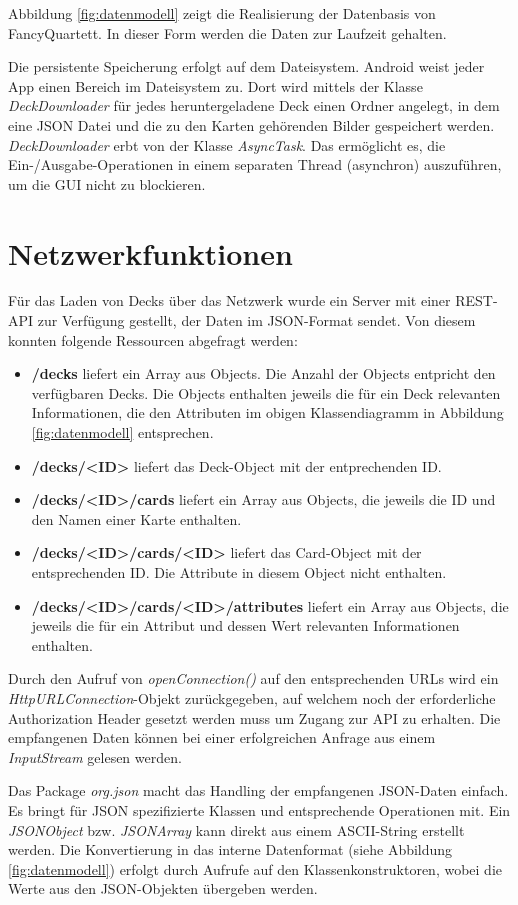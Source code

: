 Abbildung \ref{fig:datenmodell} zeigt die Realisierung der Datenbasis von FancyQuartett. In dieser Form werden die Daten zur Laufzeit gehalten.

Die persistente Speicherung erfolgt auf dem Dateisystem. Android weist jeder App einen Bereich im Dateisystem zu. Dort wird mittels der Klasse \emph{DeckDownloader} für jedes heruntergeladene Deck einen Ordner angelegt, in dem eine JSON Datei und die zu den Karten gehörenden Bilder gespeichert werden. \emph{DeckDownloader} erbt von der Klasse \emph{AsyncTask}. Das ermöglicht es, die Ein-/Ausgabe-Operationen in einem separaten Thread (asynchron) auszuführen, um die GUI nicht zu blockieren.

\section{Netzwerkfunktionen}
\label{sec:netzwerkfunktionen}

Für das Laden von Decks über das Netzwerk wurde ein Server mit einer REST-API zur Verfügung gestellt, der Daten im JSON-Format sendet. Von diesem konnten folgende Ressourcen abgefragt werden:
\begin{itemize}
    \item \textbf{/decks} liefert ein Array aus Objects. Die Anzahl der Objects entpricht den verfügbaren Decks. Die Objects enthalten jeweils die für ein Deck relevanten Informationen, die den Attributen im obigen Klassendiagramm in Abbildung \ref{fig:datenmodell} entsprechen.
    \item \textbf{/decks/<ID>} liefert das Deck-Object mit der entprechenden ID.
    \item \textbf{/decks/<ID>/cards} liefert ein Array aus Objects, die jeweils die ID und den Namen einer Karte enthalten.
    \item \textbf{/decks/<ID>/cards/<ID>} liefert das Card-Object mit der entsprechenden ID. Die Attribute in diesem Object nicht enthalten.
    \item \textbf{/decks/<ID>/cards/<ID>/attributes} liefert ein Array aus Objects, die jeweils die für ein Attribut und dessen Wert relevanten Informationen enthalten.
\end{itemize}

Durch den Aufruf von \emph{openConnection()} auf den entsprechenden URLs wird ein \emph{HttpURLConnection}-Objekt zurückgegeben, auf welchem noch der erforderliche Authorization Header gesetzt werden muss um Zugang zur API zu erhalten. Die empfangenen Daten können bei einer erfolgreichen Anfrage aus einem \emph{InputStream} gelesen werden. 

Das Package \emph{org.json} macht das Handling der empfangenen JSON-Daten einfach. Es bringt für JSON spezifizierte Klassen und entsprechende Operationen mit. Ein \emph{JSONObject} bzw. \emph{JSONArray} kann direkt aus einem ASCII-String erstellt werden. Die Konvertierung in das interne Datenformat (siehe Abbildung \ref{fig:datenmodell}) erfolgt durch Aufrufe auf den Klassenkonstruktoren, wobei die Werte aus den JSON-Objekten übergeben werden.